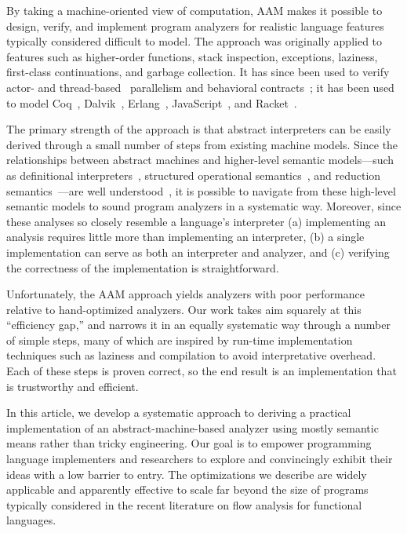 \documentclass[9pt]{sigplanconf} %
\begin{document}
%

By taking a machine-oriented view of computation, AAM makes it possible to design, verify, and implement program analyzers for realistic language features typically considered difficult to model.
%
The approach was originally applied to features such as higher-order functions, stack inspection, exceptions, laziness, first-class continuations, and garbage collection.
%
It has since been used to verify actor-\cite{local:DOsualdo:12A} and thread-based~\cite{dvanhorn:Might2011Family} parallelism and behavioral contracts~\cite{dvanhorn:TobinHochstadt2012Higherorder};
%
it has been used to model Coq~\cite{local:harvard}, Dalvik~\cite{local:dalvik}, Erlang~\cite{local:DOsualdo:12B}, JavaScript~\cite{local:DBLP:journals/corr/abs-1109-4467}, and Racket~\cite{dvanhorn:TobinHochstadt2012Higherorder}.

The primary strength of the approach is that abstract interpreters can be easily derived through a small number of steps from existing machine models.
%
Since the relationships between abstract machines and higher-level semantic models---such as definitional interpreters~\cite{dvanhorn:reynolds-hosc98}, structured operational semantics~\cite{dvanhorn:Plotkin1981Structural}, and reduction semantics~\cite{dvanhorn:Felleisen2009Semantics}---are well understood~\cite{dvanhorn:Danvy:DSc}, it is possible to navigate from these high-level semantic models to sound program analyzers in a systematic way.
%
Moreover, since these analyses so closely resemble a language's interpreter
%
(a) implementing an analysis requires little more than implementing an interpreter,
%
(b) a single implementation can serve as both an interpreter and analyzer, and
%
(c) verifying the correctness of the implementation is straightforward.

Unfortunately, the AAM approach yields analyzers with poor performance relative to hand-optimized analyzers.
%
Our work takes aim squarely at this ``efficiency gap,'' and narrows it in an equally systematic way through a number of simple steps, many of which are inspired by run-time implementation techniques such as laziness and compilation to avoid interpretative overhead.
%
Each of these steps is proven correct, so the end result is an implementation that is trustworthy and efficient.

In this article, we develop a systematic approach to deriving a practical implementation of an abstract-machine-based analyzer using mostly semantic means rather than tricky engineering.
%
Our goal is to empower programming language implementers and researchers to explore and convincingly exhibit their ideas with a low barrier to entry.
%
The optimizations we describe are widely applicable and apparently effective to scale far beyond the size of programs typically considered in the recent literature on flow analysis for functional languages.
\end{document}
